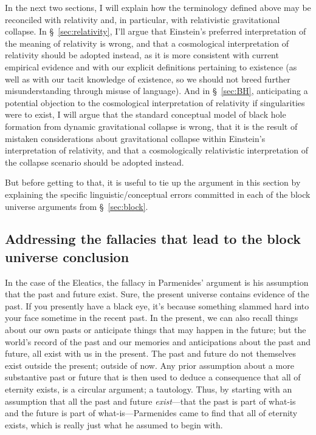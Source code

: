 \documentclass[aps,rmp,groupedaddress,twocolumn,10pt]{revtex4-2}
\begin{document}
In the next two sections, I will explain how the terminology defined above may be reconciled with relativity and, in particular, with relativistic gravitational collapse. In \S~\ref{sec:relativity}, I'll argue that Einstein's preferred interpretation of the meaning of relativity is wrong, and that a cosmological interpretation of relativity should be adopted instead, as it is more consistent with current empirical evidence and with our explicit definitions pertaining to existence (as well as with our tacit knowledge of existence, so we should not breed further misunderstanding through misuse of language). And in \S~\ref{sec:BH}, anticipating a potential objection to the cosmological interpretation of relativity if singularities were to exist, I will argue that the standard conceptual model of black hole formation from dynamic gravitational collapse is wrong, that it is the result of mistaken considerations about gravitational collapse within Einstein's interpretation of relativity, and that a cosmologically relativistic interpretation of the collapse scenario should be adopted instead.

But before getting to that, it is useful to tie up the argument in this section by explaining the specific linguistic/conceptual errors committed in each of the block universe arguments from \S~\ref{sec:block}.

\subsection{Addressing the fallacies that lead to the block universe conclusion}

In the case of the Eleatics, the fallacy in Parmenides' argument is his assumption that the past and future exist. Sure, the present universe contains evidence of the past. If you presently have a black eye, it's because something slammed hard into your face sometime in the recent past. In the present, we can also recall things about our own pasts or anticipate things that may happen in the future; but the world's record of the past and our memories and anticipations about the past and future, all exist with us in the present. The past and future do not themselves exist outside the present; outside of now. Any prior assumption about a more substantive past or future that is then used to deduce a consequence that all of eternity exists, is a circular argument; a tautology. Thus, by starting with an assumption that all the past and future \textit{exist}---that the past is part of what-is and the future is part of what-is---Parmenides came to find that all of eternity exists, which is really just what he assumed to begin with.
\end{document}
